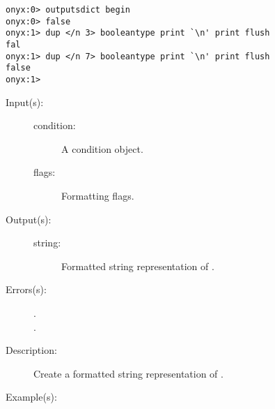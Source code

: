 \begin{description}
\begin{description}
\begin{verbatim}
onyx:0> outputsdict begin
onyx:0> false
onyx:1> dup </n 3> booleantype print `\n' print flush
fal
onyx:1> dup </n 7> booleantype print `\n' print flush
false
onyx:1>
		\end{verbatim}
	\end{description}
\label{outputsdict:conditiontype}
\item[{\onyxop{condition flags}{conditiontype}{string}}: ]
	\begin{description}\item[]
	\item[Input(s): ]
		\begin{description}\item[]
		\item[condition: ]
			A condition object.
		\item[flags: ]
			Formatting flags.
		\end{description}
	\item[Output(s): ]
		\begin{description}\item[]
		\item[string: ]
			Formatted string representation of .
		\end{description}
	\item[Errors(s): ]
		\begin{description}\item[]
		\item[.]
		\item[.]
		\end{description}
	\item[Description: ]
		Create a formatted string representation of .
	\item[Example(s): ]\begin{verbatim}


\end{verbatim}
\end{description}
\end{description}
